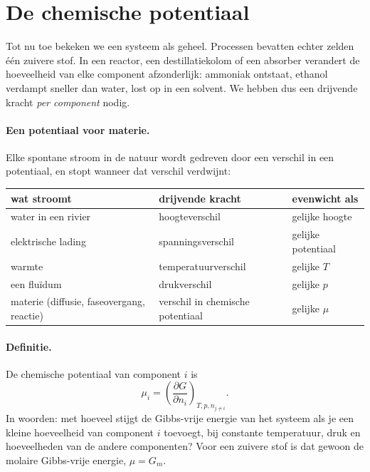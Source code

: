 \section{De chemische potentiaal}
\label{sec:chemische-potentiaal}

Tot nu toe bekeken we een systeem als geheel. Processen bevatten echter zelden \'e\'en zuivere stof. In een reactor, een destillatiekolom of een absorber verandert de hoeveelheid van elke component afzonderlijk: ammoniak ontstaat, ethanol verdampt sneller dan water,  lost op in een solvent. We hebben dus een drijvende kracht \emph{per component} nodig.

\paragraph{Een potentiaal voor materie.} Elke spontane stroom in de natuur wordt gedreven door een verschil in een potentiaal, en stopt wanneer dat verschil verdwijnt:
\begin{center}
\begin{tabular}{lll}
\toprule
wat stroomt & drijvende kracht & evenwicht als \\
\midrule
water in een rivier & hoogteverschil & gelijke hoogte \\
elektrische lading & spanningsverschil & gelijke potentiaal \\
warmte & temperatuurverschil & gelijke $T$ \\
een fluïdum & drukverschil & gelijke $p$ \\
materie (diffusie, faseovergang, reactie) & verschil in chemische potentiaal & gelijke $\mu$ \\
\bottomrule
\end{tabular}
\end{center}

\paragraph{Definitie.} De chemische potentiaal van component $i$ is
\begin{equation}
\mu_i = \left(\frac{\partial G}{\partial n_i}\right)_{T,p,n_{j\neq i}} .
\end{equation}
In woorden: met hoeveel stijgt de Gibbs-vrije energie van het systeem als je een kleine hoeveelheid van component $i$ toevoegt, bij constante temperatuur, druk en hoeveelheden van de andere componenten? Voor een zuivere stof is dat gewoon de molaire Gibbs-vrije energie, $\mu = G_m$.

